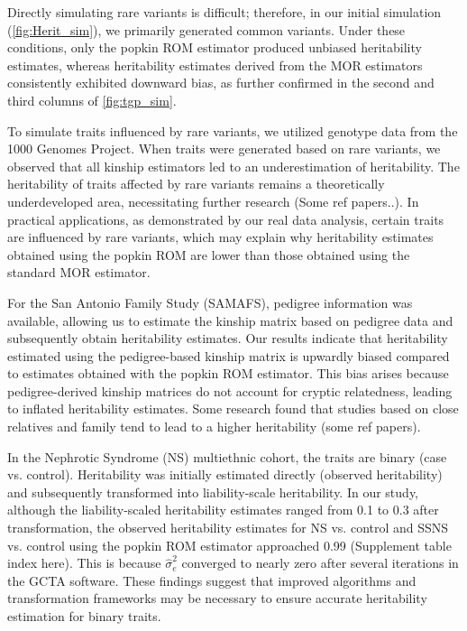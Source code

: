 \documentclass[11pt]{article}
\begin{document}
Directly simulating rare variants is difficult; therefore, in our initial simulation (\cref{fig:Herit_sim}), we primarily generated common variants. Under these conditions, only the popkin ROM estimator produced unbiased heritability estimates, whereas heritability estimates derived from the MOR estimators consistently exhibited downward bias, as further confirmed in the second and third columns of \cref{fig:tgp_sim}.

To simulate traits influenced by rare variants, we utilized genotype data from the 1000 Genomes Project. When traits were generated based on rare variants, we observed that all kinship estimators led to an underestimation of heritability. The heritability of traits affected by rare variants remains a theoretically underdeveloped area, necessitating further research (Some ref papers..). In practical applications, as demonstrated by our real data analysis, certain traits are influenced by rare variants, which may explain why heritability estimates obtained using the popkin ROM are lower than those obtained using the standard MOR estimator.

For the San Antonio Family Study (SAMAFS), pedigree information was available, allowing us to estimate the kinship matrix based on pedigree data and subsequently obtain heritability estimates. Our results indicate that heritability estimated using the pedigree-based kinship matrix is upwardly biased compared to estimates obtained with the popkin ROM estimator. This bias arises because pedigree-derived kinship matrices do not account for cryptic relatedness, leading to inflated heritability estimates. Some research found that studies based on close relatives and family tend to lead to a higher heritability (some ref papers).  


In the Nephrotic Syndrome (NS) multiethnic cohort, the traits are binary (case vs. control). Heritability was initially estimated directly (observed heritability) and subsequently transformed into liability-scale heritability. In our study, although the liability-scaled heritability estimates ranged from 0.1 to 0.3 after transformation, the observed heritability estimates for NS vs. control and SSNS vs. control using the popkin ROM estimator approached 0.99 (Supplement table index here). This is because $\hat{\sigma}^2_e$ converged to nearly zero after several iterations in the GCTA software. These findings suggest that improved algorithms and transformation frameworks may be necessary to ensure accurate heritability estimation for binary traits.
\end{document}
